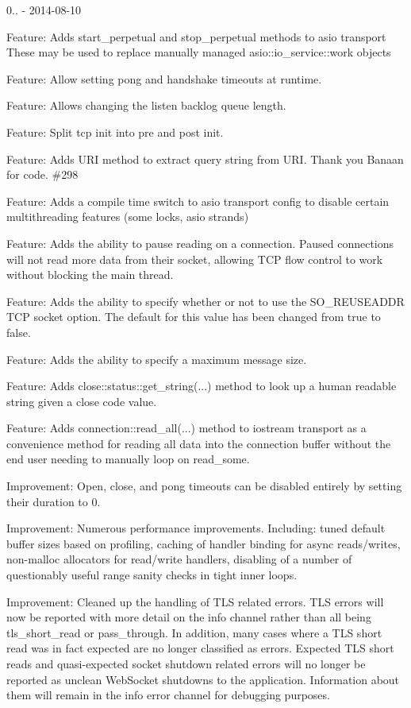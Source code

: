 0.. -\/ 2014-\/08-\/10
\begin{DoxyItemize}
\item Feature\+: Adds {\ttfamily start\+\_\+perpetual} and {\ttfamily stop\+\_\+perpetual} methods to asio transport These may be used to replace manually managed {\ttfamily asio\+::io\+\_\+service\+::work} objects
\item Feature\+: Allow setting pong and handshake timeouts at runtime.
\item Feature\+: Allows changing the listen backlog queue length.
\item Feature\+: Split tcp init into pre and post init.
\item Feature\+: Adds URI method to extract query string from URI. Thank you Banaan for code. \#298
\item Feature\+: Adds a compile time switch to asio transport config to disable certain multithreading features (some locks, asio strands)
\item Feature\+: Adds the ability to pause reading on a connection. Paused connections will not read more data from their socket, allowing TCP flow control to work without blocking the main thread.
\item Feature\+: Adds the ability to specify whether or not to use the {\ttfamily SO\+\_\+\+REUSEADDR} TCP socket option. The default for this value has been changed from {\ttfamily true} to {\ttfamily false}.
\item Feature\+: Adds the ability to specify a maximum message size.
\item Feature\+: Adds {\ttfamily close\+::status\+::get\+\_\+string(...)} method to look up a human readable string given a close code value.
\item Feature\+: Adds {\ttfamily connection\+::read\+\_\+all(...)} method to iostream transport as a convenience method for reading all data into the connection buffer without the end user needing to manually loop on {\ttfamily read\+\_\+some}.
\item Improvement\+: Open, close, and pong timeouts can be disabled entirely by setting their duration to 0.
\item Improvement\+: Numerous performance improvements. Including\+: tuned default buffer sizes based on profiling, caching of handler binding for async reads/writes, non-\/malloc allocators for read/write handlers, disabling of a number of questionably useful range sanity checks in tight inner loops.
\item Improvement\+: Cleaned up the handling of TLS related errors. TLS errors will now be reported with more detail on the info channel rather than all being {\ttfamily tls\+\_\+short\+\_\+read} or {\ttfamily pass\+\_\+through}. In addition, many cases where a TLS short read was in fact expected are no longer classified as errors. Expected TLS short reads and quasi-\/expected socket shutdown related errors will no longer be reported as unclean Web\+Socket shutdowns to the application. Information about them will remain in the info error channel for debugging purposes.

\end{DoxyItemize}
